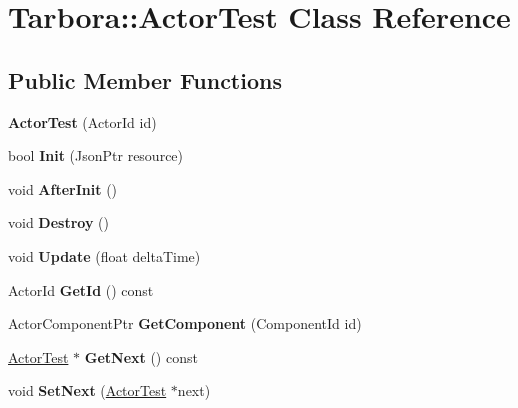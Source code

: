 \hypertarget{classTarbora_1_1ActorTest}{}\section{Tarbora\+:\+:Actor\+Test Class Reference}
\label{classTarbora_1_1ActorTest}
\subsection*{Public Member Functions}
\begin{DoxyCompactItemize}
\item 
\mbox{\label{classTarbora_1_1ActorTest_ad457e844af597ea30074df91d60d628c}} 
{\bfseries Actor\+Test} (Actor\+Id id)
\item 
\mbox{\label{classTarbora_1_1ActorTest_af2567777db6e4d75c021a8df4b253a1b}} 
bool {\bfseries Init} (Json\+Ptr resource)
\item 
\mbox{\label{classTarbora_1_1ActorTest_ad2e97ec6385c50cfb66078bdcc5d952d}} 
void {\bfseries After\+Init} ()
\item 
\mbox{\label{classTarbora_1_1ActorTest_a21c45d268e7d3a8f4f6fc059d8d66a92}} 
void {\bfseries Destroy} ()
\item 
\mbox{\label{classTarbora_1_1ActorTest_a363465e2cc6e35bc8a6d8fce27a132e1}} 
void {\bfseries Update} (float delta\+Time)
\item 
\mbox{\label{classTarbora_1_1ActorTest_a5c561bad40317d007cc45e9857341c13}} 
Actor\+Id {\bfseries Get\+Id} () const
\item 
\mbox{\label{classTarbora_1_1ActorTest_aba485020e32f40d814aa9573d540de73}} 
Actor\+Component\+Ptr {\bfseries Get\+Component} (Component\+Id id)
\item 
\mbox{\label{classTarbora_1_1ActorTest_a98299208ea87526838a5f218e28cd447}} 
\hyperlink{classTarbora_1_1ActorTest}{Actor\+Test} $\ast$ {\bfseries Get\+Next} () const
\item 
\mbox{\label{classTarbora_1_1ActorTest_affe274cb45db8c34aa7edc562964a678}} 
void {\bfseries Set\+Next} (\hyperlink{classTarbora_1_1ActorTest}{Actor\+Test} $\ast$next)
\end{DoxyCompactItemize}
